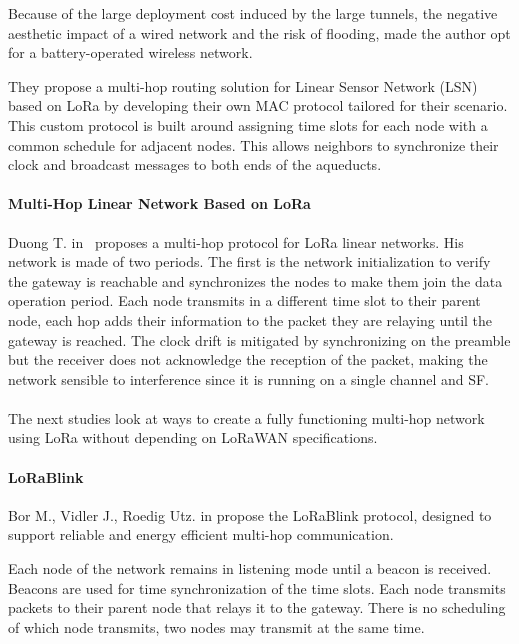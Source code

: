 Because of the large deployment cost induced by the large tunnels, the negative
aesthetic impact of a wired network and the risk of flooding, made the author
opt for a battery-operated wireless network.


They propose a multi-hop routing solution for Linear Sensor Network (LSN) based
on LoRa by developing their own MAC protocol tailored for their scenario.
This custom protocol is built around assigning time slots for each node with
a common schedule for adjacent nodes.
This allows neighbors to synchronize their clock and broadcast messages to
both ends of the aqueducts.


\paragraph{Multi-Hop Linear Network Based on LoRa}

Duong T. in~\cite{duong2018} proposes a multi-hop protocol for LoRa linear
networks.
His network is made of two periods. The first is the network initialization to
verify the gateway is reachable and synchronizes the nodes to make them join the
data operation period.
Each node transmits in a different time slot to their parent node, each hop adds
their information to the packet they are relaying until the gateway is
reached.
The clock drift is mitigated by synchronizing on the preamble but the receiver
does not acknowledge the reception of the packet, making the network sensible to
interference since it is running on a single channel and SF.

\paragraph{}

The next studies look at ways to create a fully functioning multi-hop network
using LoRa without depending on LoRaWAN specifications.

\paragraph{LoRaBlink}

Bor M., Vidler J., Roedig Utz. in \cite{lorablink} propose the LoRaBlink
protocol, designed to support reliable and energy efficient multi-hop
communication.

Each node of the network remains in listening mode until a beacon is received.
Beacons are used for time synchronization of the time slots.
Each node transmits packets to their parent node that relays it to the gateway.
There is no scheduling of which node transmits, two nodes may
transmit at the same time.

